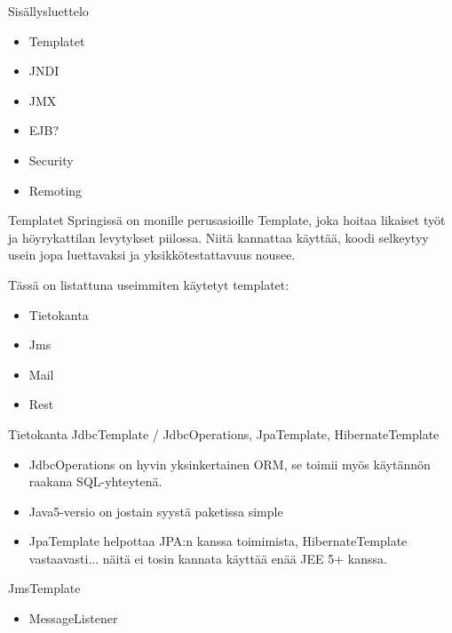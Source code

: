 \documentclass[hyperref={pdfauthor=\AUTHOR},14pt]{beamer}
\author{\AUTHOR}
\title[\TITLE]{\TITLE}
\date{\DATE}
\begin{document}
\begin{frame}[plain]
\titlepage
\end{frame}

\begin{frame}{Sisällysluettelo}
\begin{itemize}
\item Templatet
\item JNDI
\item JMX
\item EJB?
\item Security
\item Remoting
\end{itemize}
\end{frame}

\begin{frame}{Templatet}
Springissä on monille perusasioille Template, joka hoitaa likaiset työt ja höyrykattilan levytykset piilossa. Niitä kannattaa käyttää, koodi selkeytyy usein jopa luettavaksi ja yksikkötestattavuus nousee.

Tässä on listattuna useimmiten käytetyt templatet:
\begin{itemize}
\item Tietokanta
\item Jms
\item Mail
\item Rest
\end{itemize}
\end{frame}

\begin{frame}{Tietokanta}
JdbcTemplate / JdbcOperations,  JpaTemplate, HibernateTemplate
\begin{itemize}
\item JdbcOperations on hyvin yksinkertainen ORM, se toimii myös käytännön raakana SQL-yhteytenä.
\item Java5-versio on jostain syystä paketissa simple
\item JpaTemplate helpottaa JPA:n kanssa toimimista, HibernateTemplate
  vastaavasti... näitä ei tosin kannata käyttää enää JEE 5+ kanssa.
\end{itemize}
\end{frame}

\begin{frame}{JmsTemplate}
\begin{itemize}
\item MessageListener
\end{itemize}
\end{frame}
\end{document}
